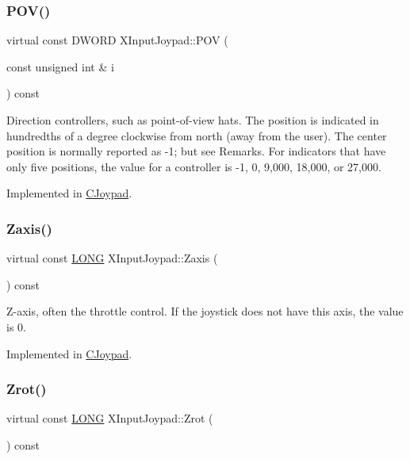 \subsubsection{\texorpdfstring{P\+O\+V()}{POV()}}
{\footnotesize\ttfamily virtual const D\+W\+O\+RD X\+Input\+Joypad\+::\+P\+OV (\begin{DoxyParamCaption}\item[{const unsigned int \&}]{i }\end{DoxyParamCaption}) const\hspace{0.3cm}{\ttfamily [pure virtual]}}

Direction controllers, such as point-\/of-\/view hats. The position is indicated in hundredths of a degree clockwise from north (away from the user). The center position is normally reported as -\/1; but see Remarks. For indicators that have only five positions, the value for a controller is -\/1, 0, 9,000, 18,000, or 27,000. 

Implemented in \hyperlink{class_c_joypad_a52dad2bae4ae8ef1574d963bdd4c1a5d}{C\+Joypad}.

\mbox{\label{struct_x_input_joypad_af4bfca4d8f22808a92a0ae26468cdedc}} 
\subsubsection{\texorpdfstring{Zaxis()}{Zaxis()}}
{\footnotesize\ttfamily virtual const \hyperlink{_joypad_8h_a2a3e0cda5f1249bef6db47c5eb8e3813}{L\+O\+NG} X\+Input\+Joypad\+::\+Zaxis (\begin{DoxyParamCaption}{ }\end{DoxyParamCaption}) const\hspace{0.3cm}{\ttfamily [pure virtual]}}

Z-\/axis, often the throttle control. If the joystick does not have this axis, the value is 0. 

Implemented in \hyperlink{class_c_joypad_a1ab390e90331bc036447eb4fc477e796}{C\+Joypad}.

\mbox{\label{struct_x_input_joypad_a4319cae362154a8e069ebe290db8239b}} 
\subsubsection{\texorpdfstring{Zrot()}{Zrot()}}
{\footnotesize\ttfamily virtual const \hyperlink{_joypad_8h_a2a3e0cda5f1249bef6db47c5eb8e3813}{L\+O\+NG} X\+Input\+Joypad\+::\+Zrot (\begin{DoxyParamCaption}{ }\end{DoxyParamCaption}) const\hspace{0.3cm}{\ttfamily [pure virtual]}}

